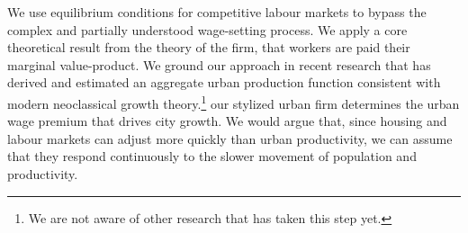  We use equilibrium conditions for competitive labour markets to bypass the complex and partially understood wage-setting process. We apply a core theoretical result from the theory of the firm, that workers are paid their \gls{marginal value-product}. We ground our approach in recent research that has derived and estimated an aggregate urban production function consistent with modern \gls{neoclassical growth theory}.\footnote{We are not aware of other research that has taken this step yet.} our stylized urban firm determines the urban wage premium that drives city growth. We would argue that, since housing and labour markets can adjust more quickly than urban productivity, we can assume that they respond continuously to the slower movement of population and productivity. %









